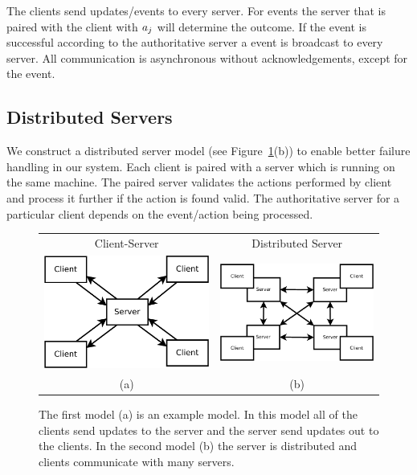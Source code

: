 	The clients send updates/events to every server. For  events the server that is paired with the client with $a_{j}$ will determine the outcome. If the  event is successful according to the authoritative server a  event is broadcast to every server. All communication is asynchronous without acknowledgements, except for the  event.


\subsection{Distributed Servers}
\label{subsec:distributed-servers}

	We construct a distributed server model (see Figure~\ref{figure:server-models}(b)) to enable better failure handling in our system. Each client is paired with a server which is running on the same machine. The paired server validates the actions performed by client and process it further if the action is found valid. The authoritative server for a particular client depends on the event/action being processed. 
	
	\begin{figure}[ht]
	\centering
	\begin{tabular}{c c}
		Client-Server & Distributed Server \\
		\includegraphics[width=0.44\linewidth]{../images/client-server-model-crop.pdf} &
		\includegraphics[width=0.48\linewidth]{../images/client-distributed-server-model-crop.pdf} \\
		(a) & (b)
	\end{tabular}

	\caption{\label{figure:server-models} The first model (a) is an example \clientServer model. In this model all of the clients send updates to the server and the server send updates out to the clients. In the second model (b) the server is distributed and clients communicate with many servers.}
	\end{figure}
	
